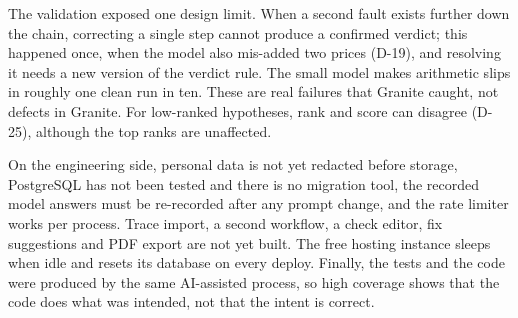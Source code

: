 The validation exposed one design limit. When a second fault exists further down the chain, correcting a single step cannot produce a confirmed verdict; this happened once, when the model also mis-added two prices (D-19), and resolving it needs a new version of the verdict rule. The small model makes arithmetic slips in roughly one clean run in ten. These are real failures that Granite caught, not defects in Granite. For low-ranked hypotheses, rank and score can disagree (D-25), although the top ranks are unaffected.

On the engineering side, personal data is not yet redacted before storage, PostgreSQL has not been tested and there is no migration tool, the recorded model answers must be re-recorded after any prompt change, and the rate limiter works per process. Trace import, a second workflow, a check editor, fix suggestions and PDF export are not yet built. The free hosting instance sleeps when idle and resets its database on every deploy. Finally, the tests and the code were produced by the same AI-assisted process, so high coverage shows that the code does what was intended, not that the intent is correct.
